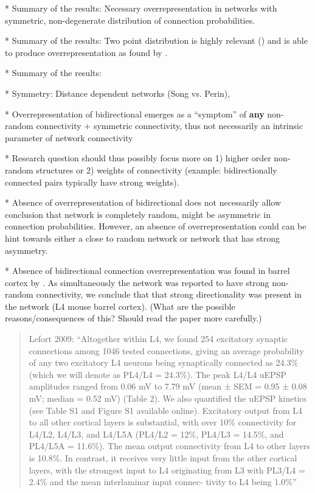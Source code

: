 

* Summary of the results: Necessary overrepresentation in networks with symmetric, non-degenerate distribution of connection probabilities.

* Summary of the results: Two point distribution is highly relevant (\cite{Lee2016}) and is able to produce overrepresentation as found by \cite{Song2005}.

* Summary of the results: 


* Symmetry: Distance dependent networks (Song vs. Perin),

* Overrepresentation of bidirectional emerges as a \enquote{symptom} of \textbf{any} non-random connectivity $+$ symmetric connectivity, thus not necessarily an intrinsic parameter of network connectivity

* Research question should thus possibly focus more on 1) higher order non-random structures or 2) weights of connectivity (example: bidirectionally connected pairs typically have strong weights). 

* Absence of overrepresentation of bidirectional does not necessarily allow conclusion that network is completely random, might be asymmetric in connection probabilities. However, an absence of overrepresentation could can be hint towards either a close to random network or network that has strong asymmetry.

* Absence of bidirectional connection overrepresentation was found in barrel cortex by \cite{Lefort2009}. As simultaneously the network was reported to have strong non-random connectivity, we conclude that that strong directionality was present in the network (L4 mouse barrel cortex). (What are the possible reasons/consequences of this? Should read the paper more carefully.)

\blockquote{Lefort 2009: \enquote{Altogether within L4, we found 254
    excitatory synaptic connections among 1046 tested connections,
    giving an average probability of any two excitatory L4 neurons
    being synaptically connected as 24.3\% (which we will denote as
    PL4/L4 = 24.3\%). The peak L4/L4 uEPSP amplitudes ranged from 0.06
    mV to 7.79 mV (mean ± SEM = 0.95 ± 0.08 mV; median = 0.52 mV)
    (Table 2). We also quantified the uEPSP kinetics (see Table S1 and
    Figure S1 available online).  Excitatory output from L4 to all other cortical layers is
    substantial, with over 10\% connectivity for L4/L2, L4/L3, and
    L4/L5A (PL4/L2 = 12\%, PL4/L3 = 14.5\%, and PL4/L5A = 11.6\%). The
    mean output connectivity from L4 to other layers is 10.8\%. In
    contrast, it receives very little input from the other cortical
    layers, with the strongest input to L4 originating from L3 with
    PL3/L4 = 2.4\% and the mean interlaminar input connec- tivity to
    L4 being 1.0\%}}
